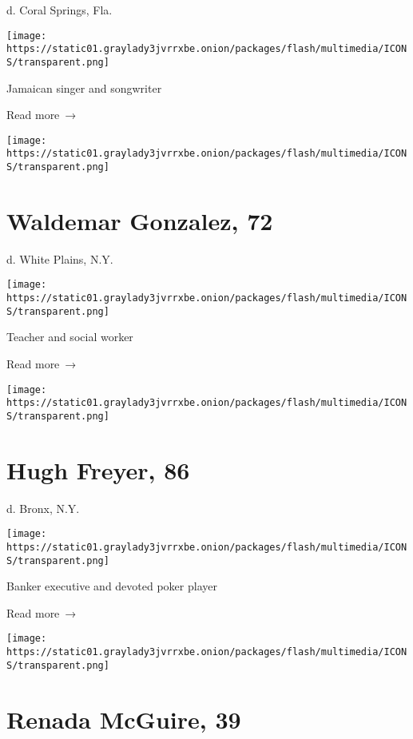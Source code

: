 d. Coral Springs, Fla.

\texttt{[image: https://static01.graylady3jvrrxbe.onion/packages/flash/multimedia/ICONS/transparent.png]}

Jamaican singer and songwriter

 Read more~→

\href{https://www.nytimes3xbfgragh.onion/2020/07/30/obituaries/waldemar-gonzalez-dead-coronavirus.html}{}

\texttt{[image: https://static01.graylady3jvrrxbe.onion/packages/flash/multimedia/ICONS/transparent.png]}

\hypertarget{waldemar-gonzalez-72}{%
\section{Waldemar Gonzalez, 72}\label{waldemar-gonzalez-72}}

d. White Plains, N.Y.

\texttt{[image: https://static01.graylady3jvrrxbe.onion/packages/flash/multimedia/ICONS/transparent.png]}

Teacher and social worker

 Read more~→

\href{https://www.nytimes3xbfgragh.onion/2020/07/30/obituaries/hugh-freyer-dead-coronavirus.html}{}

\texttt{[image: https://static01.graylady3jvrrxbe.onion/packages/flash/multimedia/ICONS/transparent.png]}

\hypertarget{hugh-freyer-86}{%
\section{Hugh Freyer, 86}\label{hugh-freyer-86}}

d. Bronx, N.Y.

\texttt{[image: https://static01.graylady3jvrrxbe.onion/packages/flash/multimedia/ICONS/transparent.png]}

Banker executive and devoted poker player

 Read more~→

\href{https://www.nytimes3xbfgragh.onion/2020/07/29/obituaries/renada-mcguire-dead-coronavirus.html}{}

\texttt{[image: https://static01.graylady3jvrrxbe.onion/packages/flash/multimedia/ICONS/transparent.png]}

\hypertarget{renada-mcguire-39}{%
\section{Renada McGuire, 39}\label{renada-mcguire-39}}

